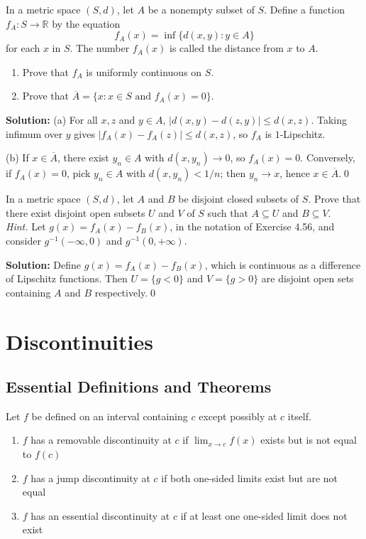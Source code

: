 \begin{problembox}
In a metric space $(S, d)$, let $A$ be a nonempty subset of $S$. Define a function $f_A : S \to \mathbb{R}$ by the equation
\[f_A(x) = \inf \{d(x, y) : y \in A\}\]
for each $x$ in $S$. The number $f_A(x)$ is called the distance from $x$ to $A$.
\begin{enumerate}[label=(\alph*)]
\item Prove that $f_A$ is uniformly continuous on $S$.
\item Prove that $\overline{A} = \{x : x \in S \text{ and } f_A(x) = 0\}$.
\end{enumerate}
\end{problembox}

\noindent\textbf{Solution:}
(a) For all $x,z$ and $y\in A$, $|d(x,y)-d(z,y)|\le d(x,z)$. Taking infimum over $y$ gives $|f_A(x)-f_A(z)|\le d(x,z)$, so $f_A$ is $1$-Lipschitz.

(b) If $x\in\overline{A}$, there exist $y_n\in A$ with $d(x,y_n)\to 0$, so $f_A(x)=0$. Conversely, if $f_A(x)=0$, pick $y_n\in A$ with $d(x,y_n)<1/n$; then $y_n\to x$, hence $x\in\overline{A}$.\qed



\begin{problembox}
In a metric space $(S, d)$, let $A$ and $B$ be disjoint closed subsets of $S$. Prove that there exist disjoint open subsets $U$ and $V$ of $S$ such that $A \subseteq U$ and $B \subseteq V$. \\
\textit{Hint.} Let $g(x) = f_A(x) - f_B(x)$, in the notation of Exercise 4.56, and consider $g^{-1}(-\infty, 0)$ and $g^{-1}(0, +\infty)$.
\end{problembox}

\noindent\textbf{Solution:}
Define $g(x)=f_A(x)-f_B(x)$, which is continuous as a difference of Lipschitz functions. Then $U=\{g<0\}$ and $V=\{g>0\}$ are disjoint open sets containing $A$ and $B$ respectively.\qed

\section{Discontinuities}

\subsection*{Essential Definitions and Theorems}

\begin{definition}
Let $f$ be defined on an interval containing $c$ except possibly at $c$ itself.
\begin{enumerate}
\item $f$ has a removable discontinuity at $c$ if $\lim_{x \to c} f(x)$ exists but is not equal to $f(c)$
\item $f$ has a jump discontinuity at $c$ if both one-sided limits exist but are not equal
\item $f$ has an essential discontinuity at $c$ if at least one one-sided limit does not exist
\end{enumerate}
\end{definition}



